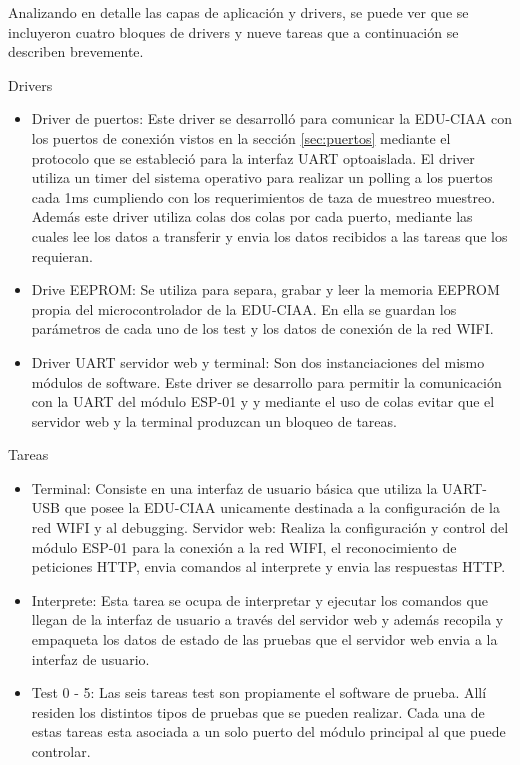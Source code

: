 Analizando en detalle las capas de aplicación y drivers, se puede ver que se incluyeron cuatro bloques de drivers y nueve tareas que a continuación se describen brevemente.

Drivers
\begin{itemize}
	\item Driver de puertos: Este driver se desarrolló para comunicar la EDU-CIAA con los puertos de conexión vistos en la sección \ref{sec:puertos} mediante el protocolo que se estableció para la interfaz UART optoaislada. El driver utiliza un timer del sistema operativo para realizar un polling a los puertos cada 1ms cumpliendo con los requerimientos de taza de muestreo muestreo. Además este driver utiliza colas dos colas por cada puerto, mediante las cuales lee los datos a transferir y envia los datos recibidos a las tareas que los requieran.
	\item Drive EEPROM: Se utiliza para separa, grabar y leer la memoria EEPROM propia del microcontrolador de la EDU-CIAA. En ella se guardan los parámetros de cada uno de los test y los datos de conexión de la red WIFI.
	\item Driver UART servidor web y terminal: Son dos instanciaciones del mismo módulos de software. Este driver se desarrollo para permitir la comunicación con la UART del módulo ESP-01 y y mediante el uso de colas evitar que el servidor web y la terminal produzcan un bloqueo de tareas.
\end{itemize}
	
Tareas
\begin{itemize}
	\item Terminal: Consiste en una interfaz de usuario básica que utiliza la UART-USB que posee la EDU-CIAA unicamente destinada a la configuración de la red WIFI y al debugging.
Servidor web: Realiza la configuración y control del módulo ESP-01 para la conexión a la red WIFI, el reconocimiento de peticiones HTTP, envia comandos al interprete y envia las respuestas HTTP. 
	\item Interprete: Esta tarea se ocupa de interpretar y ejecutar los comandos que llegan de la interfaz de usuario a través del servidor web y además recopila y empaqueta los datos de estado de las pruebas que el servidor web envia a la interfaz de usuario.
	\item Test 0 - 5: Las seis tareas test son propiamente el software de prueba. Allí residen los distintos tipos de pruebas que se pueden realizar. Cada una de estas tareas esta asociada a un solo puerto del módulo principal al que puede controlar.
\end{itemize}	
	
